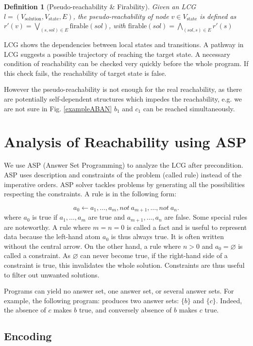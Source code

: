 \documentclass[en]{jdoc}
\newtheorem{definition}{Definition}
\begin{document}
\begin{definition}[Pseudo-reachability \& Firability]
Given an LCG $l=(V_{\text{solution}},V_{\text{state}}, E)$, the pseudo-reachability of node $v\in V_{\text{state}}$ is defined as 
$r'(v)=\bigvee_{(s,sol) \in E} \text{firable}(sol)$, with $\text{firable}(sol)=\bigwedge_{(sol,s)\in E} r'(s)$
\end{definition}\label{defPseudoReach}
LCG shows the dependencies between local states and transitions. A pathway in LCG suggests a possible trajectory of reaching the target state. A necessary condition of reachability can be checked very quickly before the whole program. If this check fails, the reachability of target state is false.

However the pseudo-reachability is not enough for the real reachability, as there are potentially self-dependent structures which impedes the reachability, e.g. we are not sure in Fig. \ref{exampleABAN} $b_1$ and $c_1$ can be reached simultaneously.

\section{Analysis of Reachability using ASP}
We use ASP  (Answer Set Programming) \cite{baral2003knowledge} to analyze the LCG after precondition. ASP uses description and constraints of the problem (called rule) instead of the imperative orders. ASP solver tackles problems by generating all the possibilities respecting the constraints. A rule is in the following form:

$$a_0 \gets a_1 , \ldots , a_m, not\ a_{m+1}, \ldots , not\ a_n.$$
where $a_0$ is true if $a_1 , \ldots , a_m$ are true and $a_{m+1}, \ldots , a_n$ are false. Some special rules are noteworthy. A rule where $m = n = 0$ is called a fact and is useful to represent data because the left-hand atom $a_0$ is thus always true. It is often written without the central arrow. On the other hand, a rule where $n > 0$ and $a_0 = \varnothing$ is called a constraint. As $\varnothing$ can never become true, if the right-hand side of a constraint is true, this invalidates the whole solution. Constraints are thus useful to filter out unwanted solutions.

Programs can yield no answer set, one answer set, or several answer sets. For example, the following program:   produces two answer sets: $\{b\}$ and $\{c\}$. Indeed, the absence of $c$ makes $b$ true, and conversely absence of $b$ makes $c$ true.
\subsection{Encoding}
\end{document}
